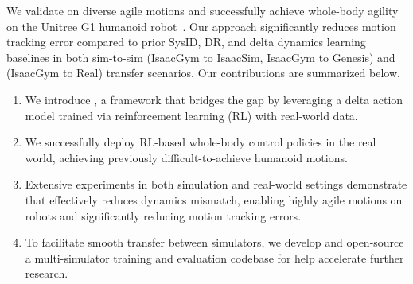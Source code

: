 We validate \method on diverse agile motions and successfully achieve whole-body agility on the Unitree G1 humanoid robot~\cite{Unitree2024G1}. Our approach significantly reduces motion tracking error compared to prior SysID, DR, and delta dynamics learning baselines in both sim-to-sim (IsaacGym to IsaacSim, IsaacGym to Genesis) and \simtoreal (IsaacGym to Real) transfer scenarios.
Our contributions are summarized below.
\begin{enumerate}
    \item We introduce \method, a framework that bridges the \simtoreal gap by leveraging a delta action model trained via reinforcement learning (RL) with real-world data.
    \item We successfully deploy RL-based whole-body control policies in the real world, achieving previously difficult-to-achieve humanoid motions.
    \item Extensive experiments in both simulation and real-world settings demonstrate that \method effectively reduces dynamics mismatch, enabling highly agile motions on robots and significantly reducing motion tracking errors.
    \item To facilitate smooth transfer between simulators, we develop and open-source a multi-simulator training and evaluation codebase for help accelerate further research.
\end{enumerate}
